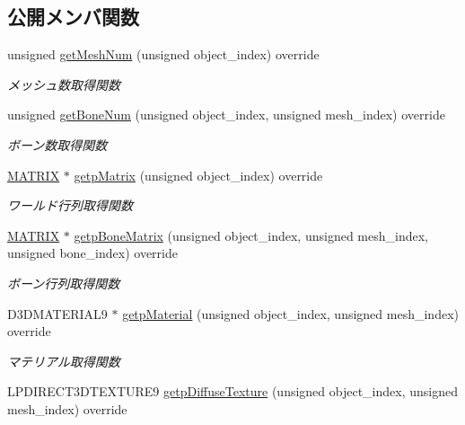 \subsection*{公開メンバ関数}
\begin{DoxyCompactItemize}
\item 
unsigned \mbox{\hyperlink{class_player_draw_ac618153d70492f73299c58a50d565431}{get\+Mesh\+Num}} (unsigned object\+\_\+index) override
\begin{DoxyCompactList}\small\item\em メッシュ数取得関数 \end{DoxyCompactList}\item 
unsigned \mbox{\hyperlink{class_player_draw_a716aeac1dca9a44c97bc2ea42e55d6f6}{get\+Bone\+Num}} (unsigned object\+\_\+index, unsigned mesh\+\_\+index) override
\begin{DoxyCompactList}\small\item\em ボーン数取得関数 \end{DoxyCompactList}\item 
\mbox{\hyperlink{_matrix_8h_a032295cd9fb1b711757c90667278e744}{M\+A\+T\+R\+IX}} $\ast$ \mbox{\hyperlink{class_player_draw_a334e94f368f6bd571da866d69333f313}{getp\+Matrix}} (unsigned object\+\_\+index) override
\begin{DoxyCompactList}\small\item\em ワールド行列取得関数 \end{DoxyCompactList}\item 
\mbox{\hyperlink{_matrix_8h_a032295cd9fb1b711757c90667278e744}{M\+A\+T\+R\+IX}} $\ast$ \mbox{\hyperlink{class_player_draw_a94e34d6503076f1686302fa376da1c09}{getp\+Bone\+Matrix}} (unsigned object\+\_\+index, unsigned mesh\+\_\+index, unsigned bone\+\_\+index) override
\begin{DoxyCompactList}\small\item\em ボーン行列取得関数 \end{DoxyCompactList}\item 
D3\+D\+M\+A\+T\+E\+R\+I\+A\+L9 $\ast$ \mbox{\hyperlink{class_player_draw_acb94ea7611a99698507321e44b7e9acb}{getp\+Material}} (unsigned object\+\_\+index, unsigned mesh\+\_\+index) override
\begin{DoxyCompactList}\small\item\em マテリアル取得関数 \end{DoxyCompactList}\item 
L\+P\+D\+I\+R\+E\+C\+T3\+D\+T\+E\+X\+T\+U\+R\+E9 \mbox{\hyperlink{class_player_draw_a3abcf6fb159e94ca4e5785b572e0af11}{getp\+Diffuse\+Texture}} (unsigned object\+\_\+index, unsigned mesh\+\_\+index) override

\end{DoxyCompactItemize}
